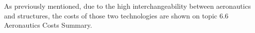 
As previously mentioned, due to the high interchangeability between aeronautics and structures, the costs of those two technologies are shown on topic 6.6 Aeronautics Costs Summary. 
